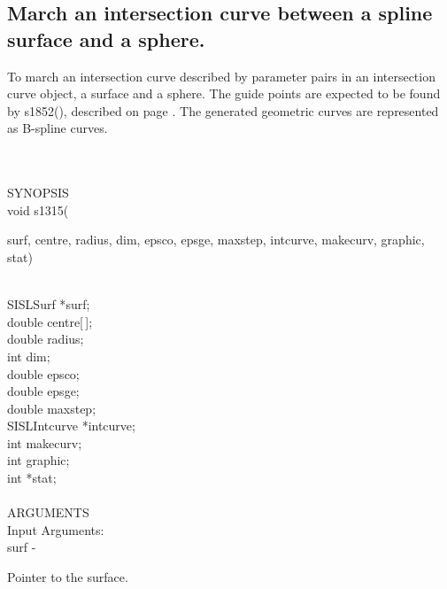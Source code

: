 \subsection{March an intersection curve between a spline surface and a sphere.}
\begin{minipg1}
  To march an intersection curve described by parameter pairs in an intersection
  curve object, a surface and a sphere.
  The guide points are expected to be found by s1852(), described on
  page \pageref{s1852}.
  The generated geometric curves are represented as B-spline curves.
\end{minipg1} \\ \\
SYNOPSIS\\
        \>void s1315(\begin{minipg3}
                {\fov surf}, {\fov centre}, {\fov radius}, {\fov dim}, {\fov epsco}, {\fov epsge}, {\fov maxstep}, {\fov intcurve},
                makecurv, graphic, stat)
                \end{minipg3}\\[0.3ex]
                \>\>    SISLSurf        \>      *{\fov surf};\\
                \>\>    double  \>      {\fov centre}[\,];\\
                \>\>    double  \>      {\fov radius};\\
                \>\>    int     \>      {\fov dim};\\
                \>\>    double  \>      {\fov epsco};\\
                \>\>    double  \>      {\fov epsge};\\
                \>\>    double  \>      {\fov maxstep};\\
                \>\>    SISLIntcurve\>  *{\fov intcurve};\\
                \>\>    int     \>      {\fov makecurv};\\
                \>\>    int     \>      {\fov graphic};\\
                \>\>    int     \>      *{\fov stat};\\
\\
ARGUMENTS\\
        \>Input Arguments:\\
        \>\>    {\fov surf}     \> - \> \begin{minipg2}
                                Pointer to the surface.
                                \end{minipg2}\\
